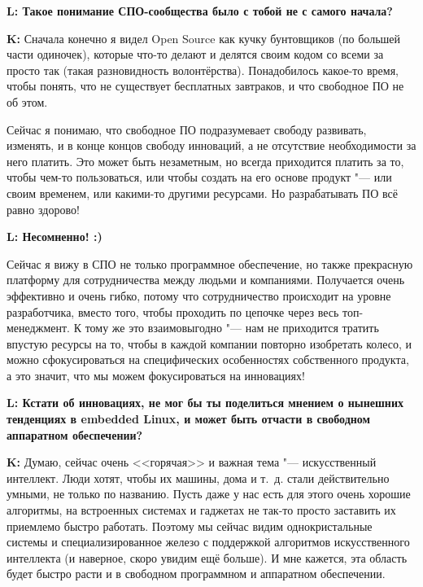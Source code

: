 \documentclass[10pt, a5paper]{article}
\begin{document}
\begin{Parallel}[p]{}{}
{{\noindent \bf L: Такое понимание СПО-сообщества было с тобой не с самого начала?}

{\noindent \bf K:} Сначала конечно я видел Open Source как кучку бунтовщиков (по большей части одиночек), которые что-то делают и делятся своим кодом со всеми за просто так (такая разновидность волонтёрства).
Понадобилось какое-то время, чтобы понять, что не существует бесплатных завтраков, и что свободное ПО не об этом.

Сейчас я понимаю, что свободное ПО подразумевает свободу развивать, изменять, и в конце концов свободу инноваций, а не отсутствие необходимости за него платить. 
Это может быть незаметным, но всегда приходится платить за то, чтобы чем-то пользоваться, или чтобы создать на его основе продукт "--- или своим временем, или какими-то другими ресурсами.
Но разрабатывать ПО всё равно здорово!

{\noindent \bf L: Несомненно! :)}

Сейчас я вижу в СПО не только программное обеспечение, но также прекрасную платформу для сотрудничества между людьми и компаниями.
Получается очень эффективно и очень гибко, потому что сотрудничество происходит на уровне разработчика, вместо того, чтобы проходить по цепочке через весь топ-менеджмент.
К тому же это взаимовыгодно "--- нам не приходится тратить впустую ресурсы на то, чтобы в каждой компании повторно изобретать колесо, и можно сфокусироваться на специфических особенностях собственного продукта, а это значит, что мы можем фокусироваться на инновациях!

{\noindent \bf L: Кстати об инновациях, не мог бы ты поделиться мнением о нынешних тенденциях в embedded Linux, и может быть отчасти в свободном аппаратном обеспечении?}

{\noindent \bf K:} Думаю, сейчас очень <<горячая>> и важная тема "--- искусственный интеллект.
Люди хотят, чтобы их машины, дома и т.~д. стали действительно умными, не только по названию.
Пусть даже у нас есть для этого очень хорошие алгоритмы, на встроенных системах и гаджетах не так-то просто заставить их приемлемо быстро работать. 
Поэтому мы сейчас видим однокристальные системы и специализированное железо с поддержкой алгоритмов искусственного интеллекта (и наверное, скоро увидим ещё больше).
И мне кажется, эта область будет быстро расти и в свободном программном и аппаратном обеспечении.

\vfill

     }
   \end{Parallel}

 
\end{document}
